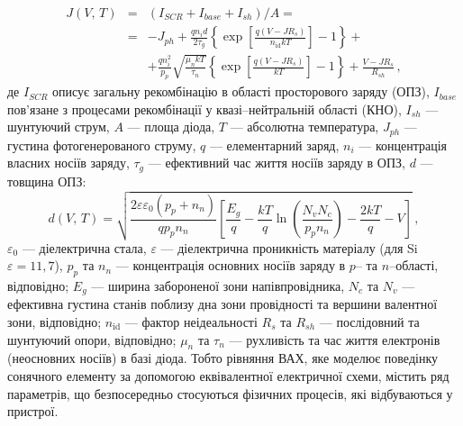\begin{eqnarray}
\label{eqSSCIV}
\nonumber J(V,\,T)&=&\left(I_{SCR}+I_{base}+I_{sh}\right)/A=\\
\nonumber &=&-J_{ph}+\frac{qn_id}{2\tau_{g}}\left\{\exp \left[\frac{q(V-JR_s)}{n_\mathrm{id}kT}\right]-1\right\}+\\
&&+\frac{qn_i^2}{p_p}\sqrt{\frac{\mu_nkT}{\tau_n}}\left\{\exp \left[\frac{q(V-JR_s)}{kT}\right]-1\right\}+\frac{V-JR_s}{R_{sh}}\,,
\end{eqnarray}
де
$I_{SCR}$ описує загальну рекомбінацію в області просторового заряду (ОПЗ),
$I_{base}$ пов'язане з процесами рекомбінації у квазі--нейтральній області (КНО),
$I_{sh}$ --- шунтуючий струм,
$A$ --- площа діода,
$T$ --- абсолютна температура,
$J_{ph}$ --- густина фотогенерованого струму,
$q$ --- елементарний заряд,
$n_i$ --- концентрація власних носіїв заряду,
$\tau_{g}$  --- ефективний час життя носіїв заряду в ОПЗ,
$d$ --- товщина ОПЗ:
\begin{equation}
\label{eqW}
    d(V,\,T)=\sqrt{\frac{2 \varepsilon \varepsilon_0(p_p+n_n)}{q p_p n_n}\left[\frac{E_g}{q}-\frac{kT}{q}\ln\left(\frac{N_vN_c}{p_pn_n}\right)-\frac{2kT}{q}-V\right]} \,,
\end{equation}
$\varepsilon_0$ --- діелектрична стала,
$\varepsilon$ --- діелектрична проникність матеріалу (для Si $\varepsilon=11,7$),
$p_p$ та $n_n$ --- концентрація основних носіїв заряду в $p$-- та $n$--області, відповідно;
$E_g$ --- ширина забороненої зони напівпровідника,
$N_c$ та $N_v$ --- ефективна густина станів поблизу дна зони провідності та вершини валентної зони, відповідно;
$n_\mathrm{id}$ --- фактор неідеальності
$R_s$ та $R_{sh}$ --- послідовний та шунтуючий опори, відповідно;
$\mu_n$ та $\tau_n$ --- рухливість та час життя електронів (неосновних носіїв) в базі діода.
Тобто
рівняння ВАХ, яке моделює поведінку сонячного елементу за допомогою еквівалентної електричної схеми,
містить ряд параметрів, що безпосередньо стосуються фізичних процесів, які відбуваються у пристрої.

